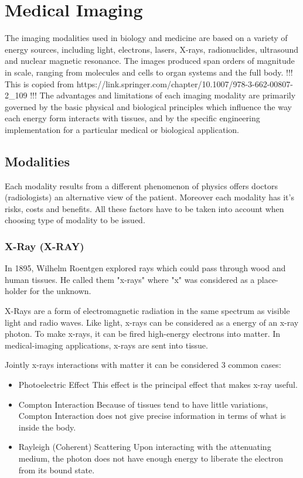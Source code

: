 \chapter{Medical Imaging}
\label{ch:rworks}

The imaging modalities used in biology and medicine are based on a variety of energy sources, including light, electrons, lasers, X-rays, radionuclides, ultrasound and nuclear magnetic resonance. The images produced span orders of magnitude in scale, ranging from molecules and cells to organ systems and the full body. !!! This is copied from https://link.springer.com/chapter/10.1007/978-3-662-00807-2_109 !!!
The advantages and limitations of each imaging modality are primarily governed by the basic physical and biological principles which influence the way each energy form interacts with tissues, and by the specific engineering implementation for a particular medical or biological application.

\section{Modalities}
Each modality results from a different phenomenon of physics offers doctors (radiologists) an alternative view of the patient. Moreover each modality has it's risks, costs and benefits. All these factors have to be taken into account when choosing type of modality to be issued.

\subsection{X-Ray (X-RAY)}
In 1895, Wilhelm Roentgen explored rays which could pass through wood and human tissues. He called them "x-rays" where "x" was considered as a place-holder for the unknown.

X-Rays are a form of electromagnetic radiation in the same spectrum as visible light and radio waves. Like light, x-rays can be considered as a energy of an x-ray photon. To make x-rays, it can be fired high-energy electrons into matter. In medical-imaging applications, x-rays are sent into tissue. 

Jointly x-rays interactions with matter it can be considered 3 common cases:
\begin{itemize}
    \item Photoelectric Effect
    \newline This effect is the principal effect that makes x-ray useful.
    \item Compton Interaction
    \newline Because of tissues tend to have little variations, Compton Interaction does not give precise information in terms of what is inside the body. 
    \item Rayleigh (Coherent) Scattering
    \newline Upon interacting with the attenuating medium, the photon does not have enough energy to liberate the electron from its bound state.
\end{itemize}


